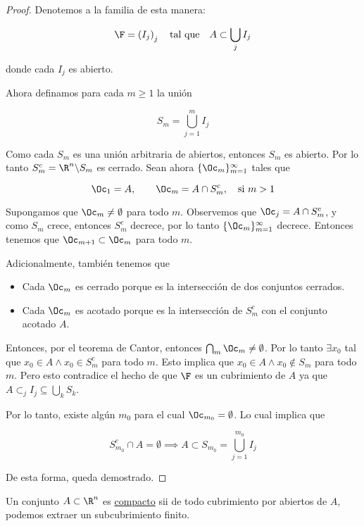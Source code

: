 \begin{proof}
    Denotemos a la familia de esta manera:
    
    \[
    \F = \left( I_j \right)_j \quad \text{tal que} \quad A \subset \bigcup_j I_j
    \]
    
    \noindent donde cada $I_j$ es abierto.
    
    Ahora definamos para cada $m \geq 1$ la unión
    
    \[
    S_m = \bigcup_{j=1}^m I_j
    \]
    
    Como cada $S_m$ es una unión arbitraria de abiertos, entonces $S_m$ es abierto. Por lo tanto $S_m^c = \R^n \backslash S_m$ es cerrado. Sean ahora $\{ \Oc_m \}_{m=1}^{\infty}$ tales que
    
    \[
    \Oc_1 = A, \qquad \Oc_m = A \cap S_m^c, \quad \text{si $m > 1$}
    \]
    
    Supongamos que $\Oc_m \neq \emptyset$ para todo $m$. Observemos que $\Oc_j = A \cap S_m^c$, y como $S_m$ crece, entonces $S_m^c$ decrece, por lo tanto $\{ \Oc_m \}_{m=1}^{\infty}$ decrece. Entonces tenemos que $\Oc_{m+1} \subset \Oc_m$ para todo $m$.
    
    Adicionalmente, también tenemos que
    
    \begin{itemize}
        \item Cada $\Oc_m$ es cerrado porque es la intersección de dos conjuntos cerrados.
        \item Cada $\Oc_m$ es acotado porque es la intersección de $S_m^c$ con el conjunto acotado $A$.
    \end{itemize}
    
    Entonces, por el teorema de Cantor, entonces $\bigcap_m \Oc_m \neq \emptyset$. Por lo tanto $\exists x_0$ tal que $x_0 \in A \wedge x_0 \in S_m^c$ para todo $m$. Esto implica que $x_0 \in A \wedge x_0 \notin S_m$ para todo $m$. Pero esto contradice el hecho de que $\F$ es un cubrimiento de $A$ ya que $A \subset_j I_j \subseteq \bigcup_k S_k$.
    
    Por lo tanto, existe algún $m_0$ para el cual $\Oc_{m_0} = \emptyset$. Lo cual implica que
    
    \[
    S_{m_0}^c \cap A = \emptyset \implies A \subset S_{m_0} = \bigcup_{j=1}^{m_0} I_j
    \]
    
    De esta forma, queda demostrado.
\end{proof}

\begin{defn}
    Un conjunto $A \subset \R^n$ es \ul{compacto} sii de todo cubrimiento por abiertos de $A$, podemos extraer un subcubrimiento finito.
\end{defn}

